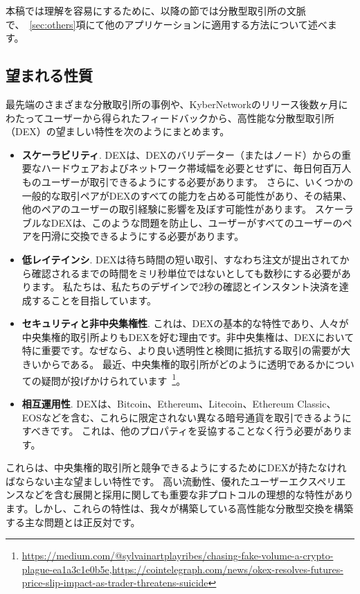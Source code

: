 本稿では理解を容易にするために、以降の節では分散型取引所の文脈で、~\ref{sec:others}項にて他のアプリケーションに適用する方法について述べます。

\subsection{望まれる性質}
最先端のさまざまな分散取引所の事例や、KyberNetworkのリリース後数ヶ月にわたってユーザーから得られたフィードバックから、高性能な分散型取引所（DEX）の望ましい特性を次のようにまとめます。

\begin{itemize}
\item \textbf{スケーラビリティ}. DEXは、DEXのバリデーター（またはノード）からの重要なハードウェアおよびネットワーク帯域幅を必要とせずに、毎日何百万人ものユーザーが取引できるようにする必要があります。 さらに、いくつかの一般的な取引ペアがDEXのすべての能力を占める可能性があり、その結果、他のペアのユーザーの取引経験に影響を及ぼす可能性があります。 スケーラブルなDEXは、このような問題を防止し、ユーザーがすべてのユーザーのペアを円滑に交換できるようにする必要があります。
\item \textbf{低レイテインシ}. DEXは待ち時間の短い取引、すなわち注文が提出されてから確認されるまでの時間をミリ秒単位ではないとしても数秒にする必要があります。 私たちは、私たちのデザインで2秒の確認とインスタント決済を達成することを目指しています。
\item \textbf{セキュリティと非中央集権性}. これは、DEXの基本的な特性であり、人々が中央集権的取引所よりもDEXを好む理由です。非中央集権は、DEXにおいて特に重要です。なぜなら、より良い透明性と検閲に抵抗する取引の需要が大きいからである。 最近、中央集権的取引所がどのように透明であるかについての疑問が投げかけられています~\footnote{\url{https://medium.com/@sylvainartplayribes/chasing-fake-volume-a-crypto-plague-ea1a3c1e0b5e},\newline \url{https://cointelegraph.com/news/okex-resolves-futures-price-slip-impact-as-trader-threatens-suicide}}。
\item \textbf{相互運用性}. DEXは、Bitcoin、Ethereum、Litecoin、Ethereum Classic、EOSなどを含む、これらに限定されない異なる暗号通貨を取引できるようにすべきです。 これは、他のプロパティを妥協することなく行う必要があります。
\end{itemize}
これらは、中央集権的取引所と競争できるようにするためにDEXが持たなければならない主な望ましい特性です。 高い流動性、優れたユーザーエクスペリエンスなどを含む展開と採用に関しても重要な非プロトコルの理想的な特性があります。しかし、これらの特性は、我々が構築している高性能な分散型交換を構築する主な問題とは正反対です。

